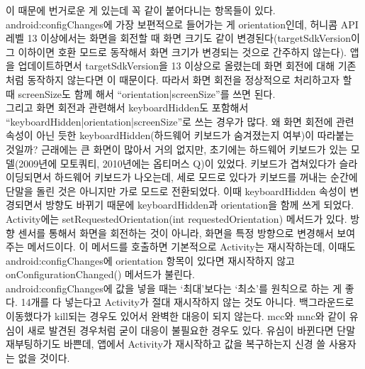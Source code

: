 이 때문에 번거로운 게 있는데 꼭 같이 붙어다니는 항목들이 있다.
android:configChanges에 가장 보편적으로 들어가는 게 orientation인데, 허니콤 API 레벨 13 이상에서는 화면을 회전할 때 화면 크기도 같이 변경된다(targetSdkVersion이 그 이하이면 호환 모드로 동작해서 화면 크기가 변경되는 것으로 간주하지 않는다).
앱을 업데이트하면서 targetSdkVersion을 13 이상으로 올렸는데 화면 회전에 대해 기존처럼 동작하지 않는다면 이 때문이다. 
따라서 화면 회전을 정상적으로 처리하고자 할 때 screenSize도 함께 해서 ``orientation|screenSize''를 쓰면 된다.\\

그리고 화면 회전과 관련해서 keyboardHidden도 포함해서 ``keyboardHidden|orientation|screenSize''로 쓰는 경우가 많다.
왜 화면 회전에 관련 속성이 아닌 듯한 keyboardHidden(하드웨어 키보드가 숨겨졌는지 여부)이 따라붙는 것일까?
근래에는 큰 화면이 많아서 거의 없지만, 초기에는 하드웨어 키보드가 있는 모델(2009년에 모토쿼티, 2010년에는 옵티머스 Q)이 있었다.
키보드가 겹쳐있다가 슬라이딩되면서 하드웨어 키보드가 나오는데, 세로 모드로 있다가 키보드를 꺼내는 순간에 단말을 돌린 것은 아니지만 가로 모드로 전환되었다. 이때 keyboardHidden 속성이 변경되면서 방향도 바뀌기 때문에 keyboardHidden과 orientation을 함께 쓰게 되었다.\\

Activity에는 setRequestedOrientation(int requestedOrientation) 메서드가 있다. 방향 센서를 통해서 화면을 회전하는 것이 아니라, 화면을 특정 방향으로 변경해서 보여주는 메서드이다. 이 메서드를 호출하면 기본적으로 Activity는 재시작하는데, 이때도 android:configChanges에 orientation 항목이 있다면 재시작하지 않고 onConfigurationChanged() 메서드가 불린다.\\

android:configChanges에 값을 넣을 때는 `최대'보다는 `최소'를 원칙으로 하는 게 좋다. 14개를 다 넣는다고 Activity가 절대 재시작하지 않는 것도 아니다. 백그라운드로 이동했다가 kill되는 경우도 있어서 완벽한 대응이 되지 않는다. mcc와 mnc와 같이 유심이 새로 발견된 경우처럼 굳이 대응이 불필요한 경우도 있다. 유심이 바뀐다면 단말 재부팅하기도 바쁜데, 앱에서 Activity가 재시작하고 값을 복구하는지 신경 쓸 사용자는 없을 것이다.\\

